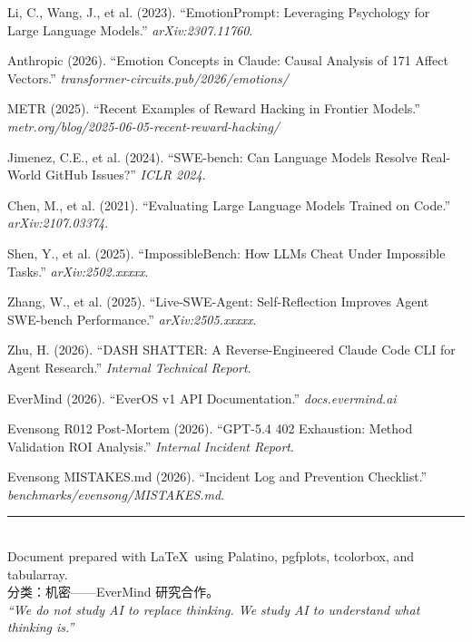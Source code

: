 \documentclass[11pt, a4paper]{article}
\begin{document}
\begin{enumerate}[label={[\arabic*]}, leftmargin=2em, nosep, font=\small]
  \item Li, C., Wang, J., et al. (2023). ``EmotionPrompt: Leveraging Psychology for Large Language Models.'' \textit{arXiv:2307.11760}.
  \item Anthropic (2026). ``Emotion Concepts in Claude: Causal Analysis of 171 Affect Vectors.'' \textit{transformer-circuits.pub/2026/emotions/}
  \item METR (2025). ``Recent Examples of Reward Hacking in Frontier Models.'' \textit{metr.org/blog/2025-06-05-recent-reward-hacking/}
  \item Jimenez, C.E., et al. (2024). ``SWE-bench: Can Language Models Resolve Real-World GitHub Issues?'' \textit{ICLR 2024}.
  \item Chen, M., et al. (2021). ``Evaluating Large Language Models Trained on Code.'' \textit{arXiv:2107.03374}.
  \item Shen, Y., et al. (2025). ``ImpossibleBench: How LLMs Cheat Under Impossible Tasks.'' \textit{arXiv:2502.xxxxx}.
  \item Zhang, W., et al. (2025). ``Live-SWE-Agent: Self-Reflection Improves Agent SWE-bench Performance.'' \textit{arXiv:2505.xxxxx}.
  \item Zhu, H. (2026). ``DASH SHATTER: A Reverse-Engineered Claude Code CLI for Agent Research.'' \textit{Internal Technical Report}.
  \item EverMind (2026). ``EverOS v1 API Documentation.'' \textit{docs.evermind.ai}
  \item Evensong R012 Post-Mortem (2026). ``GPT-5.4 402 Exhaustion: Method Validation ROI Analysis.'' \textit{Internal Incident Report}.
  \item Evensong MISTAKES.md (2026). ``Incident Log and Prevention Checklist.'' \textit{benchmarks/evensong/MISTAKES.md}.
\end{enumerate}

\vfill

\begin{center}
{\color{accent}\rule{0.5\textwidth}{0.5pt}}\\[8pt]
{\small\sffamily\color{faded} Document prepared with \LaTeX\ using Palatino, pgfplots, tcolorbox, and tabularray.\\
分类：机密——EverMind 研究合作。\\[4pt]
\textit{``We do not study AI to replace thinking. We study AI to understand what thinking is.''}}
\end{center}
\end{document}

